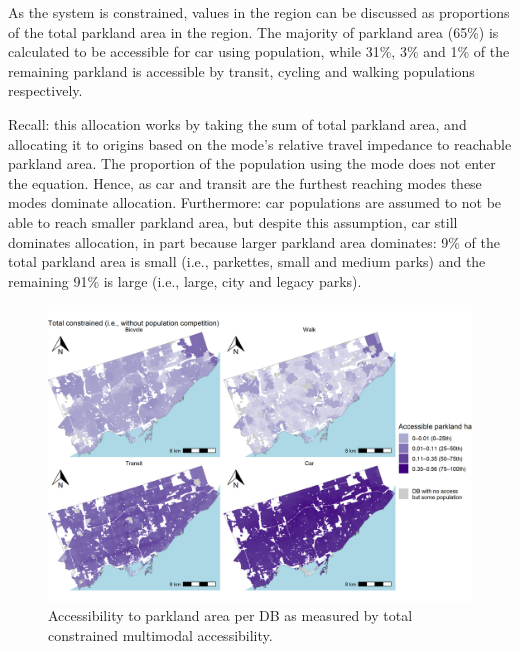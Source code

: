 \documentclass[
11pt, %
oneside, %
english, %
singlespacing, %
]{macthesis} %
\begin{document}
As the system is constrained, values in the region can be discussed as proportions of the total parkland area in the region. The majority of parkland area (65\%) is calculated to be accessible for car using population, while 31\%, 3\% and 1\% of the remaining parkland is accessible by transit, cycling and walking populations respectively.

Recall: this allocation works by taking the sum of total parkland area, and allocating it to origins based on the mode's relative travel impedance to reachable parkland area. The proportion of the population using the mode does not enter the equation. Hence, as car and transit are the furthest reaching modes these modes dominate allocation. Furthermore: car populations are assumed to not be able to reach smaller parkland area, but despite this assumption, car still dominates allocation, in part because larger parkland area dominates: 9\% of the total parkland area is small (i.e., parkettes, small and medium parks) and the remaining 91\% is large (i.e., large, city and legacy parks).

\begin{figure}

{\centering \includegraphics[width=6in]{./data/figures/chp5-mm_parkland_total_conc_access_DB_plots} 

}

\caption{\label{fig:chp5-mm_parkland_total_conc_access_DB_plots}Accessibility to parkland area per DB as measured by total constrained multimodal accessibility.}\label{fig:unnamed-chunk-77}
\end{figure}
\end{document}
